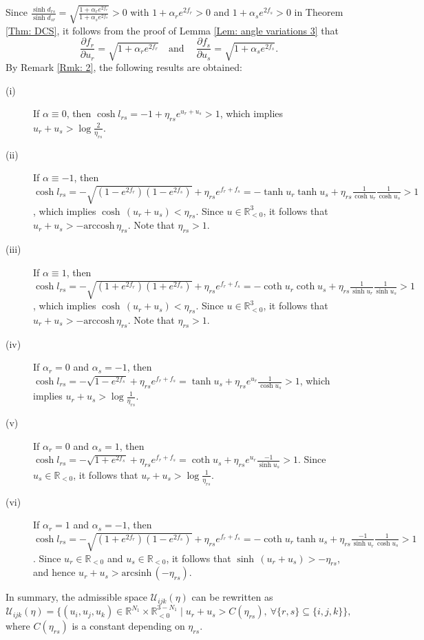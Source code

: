 \documentclass[12pt]{amsart}
\theoremstyle{definition}
\begin{document}
Since $\frac{\sinh d_{rs}}{\sinh d_{sr}}
=\sqrt{\frac{1+\alpha_re^{2f_r}}{1+\alpha_se^{2f_s}}}>0$ with $1+\alpha_{r}e^{2f_r}>0$ and $1+\alpha_{s}e^{2f_s}>0$ in Theorem \ref{Thm: DCS},
it follows from the proof of Lemma \ref{Lem: angle variations 3} that
\begin{equation}\label{Eq: F32}
\frac{\partial f_r}{\partial u_r}
=\sqrt{1+\alpha_re^{2f_r}} \quad \text{and}\ \quad
\frac{\partial f_s}{\partial u_s}=\sqrt{1+\alpha_se^{2f_s}}.
\end{equation}
By Remark \ref{Rmk: 2}, the following results are obtained:
\begin{description}
\item[(i)]
If $\alpha\equiv0$, then $\cosh l_{rs}=-1+\eta_{rs}e^{u_r+u_s}>1$,
which implies $u_r+u_s>\log \frac{2}{\eta_{rs}}$.
\item[(ii)]
If $\alpha\equiv-1$,
then $\cosh l_{rs}=-\sqrt{(1-e^{2f_r})(1-e^{2f_s})}
+\eta_{rs}e^{f_r+f_s}
=-\tanh u_r\tanh u_s+\eta_{rs}\frac{1}{\cosh u_r}\frac{1}{\cosh u_s}>1$,
which implies $\cosh\, (u_r+u_s)<\eta_{rs}$.
Since $u\in \mathbb{R}^3_{<0}$,
it follows that $u_r+u_s>-\mathrm{arccosh}\, \eta_{rs}$.
Note that $\eta_{rs}>1$.
\item[(iii)]
If $\alpha\equiv1$, then $\cosh l_{rs}=-\sqrt{(1+e^{2f_r})(1+e^{2f_s})}
+\eta_{rs}e^{f_r+f_s}=-\coth u_r\coth u_s+\eta_{rs}\frac{1}{\sinh u_r}\frac{1}{\sinh u_s}>1$,
which implies $\cosh\, (u_r+u_s)<\eta_{rs}$.
Since $u\in \mathbb{R}^3_{<0}$,
it follows that $u_r+u_s>-\mathrm{arccosh}\, \eta_{rs}$.
Note that $\eta_{rs}>1$.
\item[(iv)]
If $\alpha_r=0$ and $\alpha_s=-1$, then
$\cosh l_{rs}=-\sqrt{1-e^{2f_s}}
+\eta_{rs}e^{f_r+f_s}=\tanh u_s+\eta_{rs}e^{u_r}\frac{1}{\cosh u_s}>1$,
which implies $u_r+u_s>\log \frac{1}{\eta_{rs}}$.
\item[(v)]
If $\alpha_r=0$ and $\alpha_s=1$, then
$\cosh l_{rs}=-\sqrt{1+e^{2f_s}}
+\eta_{rs}e^{f_r+f_s}=\coth u_s+\eta_{rs}e^{u_r}\frac{-1}{\sinh u_s}>1$.
Since $u_s\in \mathbb{R}_{<0}$,
it follows that $u_r+u_s>\log \frac{1}{\eta_{rs}}$.
\item[(vi)]
If $\alpha_r=1$ and $\alpha_s=-1$, then
$\cosh l_{rs}=-\sqrt{(1+e^{2f_r})(1-e^{2f_s})}
+\eta_{rs}e^{f_r+f_s}=-\coth u_r\tanh u_s+\eta_{rs}\frac{-1}{\sinh u_r}\frac{1}{\cosh u_s}>1$.
Since $u_r\in \mathbb{R}_{<0}$ and $u_s\in \mathbb{R}_{<0}$,
it follows that $\sinh\,(u_r+u_s)>-\eta_{rs}$, and hence $u_r+u_s>\mathrm{arcsinh}\, (-\eta_{rs})$.
\end{description}
In summary, the admissible space $\mathcal{U}_{ijk}(\eta)$ can be rewritten as
\begin{equation}\label{Eq: admissible space a2}
\mathcal{U}_{ijk}(\eta)
=\{(u_i,u_j,u_k)\in \mathbb{R}^{N_1}\times \mathbb{R}_{<0}^{3-N_1}\mid u_r+u_s>C(\eta_{rs}),\ \forall\{r,s\}\subseteq\{i,j,k\}\},
\end{equation}
where $C(\eta_{rs})$ is a constant depending on $\eta_{rs}$.
\end{document}
